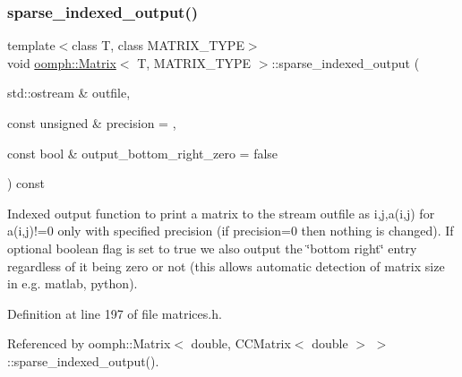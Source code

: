 \subsubsection{\texorpdfstring{sparse\+\_\+indexed\+\_\+output()}{sparse\_indexed\_output()}\hspace{0.1cm}{\footnotesize\ttfamily [1/2]}}
{\footnotesize\ttfamily template$<$class T, class M\+A\+T\+R\+I\+X\+\_\+\+T\+Y\+PE$>$ \\
void \hyperlink{classoomph_1_1Matrix}{oomph\+::\+Matrix}$<$ T, M\+A\+T\+R\+I\+X\+\_\+\+T\+Y\+PE $>$\+::sparse\+\_\+indexed\+\_\+output (\begin{DoxyParamCaption}\item[{std\+::ostream \&}]{outfile,  }\item[{const unsigned \&}]{precision = {},  }\item[{const bool \&}]{output\+\_\+bottom\+\_\+right\+\_\+zero = {\ttfamily false} }\end{DoxyParamCaption}) const\hspace{0.3cm}{\ttfamily [inline]}}



Indexed output function to print a matrix to the stream outfile as i,j,a(i,j) for a(i,j)!=0 only with specified precision (if precision=0 then nothing is changed). If optional boolean flag is set to true we also output the \char`\"{}bottom right\char`\"{} entry regardless of it being zero or not (this allows automatic detection of matrix size in e.\+g. matlab, python). 



Definition at line 197 of file matrices.\+h.



Referenced by oomph\+::\+Matrix$<$ double, C\+C\+Matrix$<$ double $>$ $>$\+::sparse\+\_\+indexed\+\_\+output().

\mbox{\label{classoomph_1_1Matrix_ac7473fb07d4db925b4cf3a22131b561a}} 
